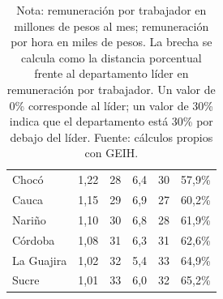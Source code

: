 \begin{table}[H]
\begin{tabular}{lrrrrr}
Chocó & 1,22 & 28 & 6,4 & 30 & 57,9\% \\
Cauca & 1,15 & 29 & 6,9 & 27 & 60,2\% \\
Nariño & 1,10 & 30 & 6,8 & 28 & 61,9\% \\
Córdoba & 1,08 & 31 & 6,3 & 31 & 62,6\% \\
La Guajira & 1,02 & 32 & 5,4 & 33 & 64,9\% \\
Sucre & 1,01 & 33 & 6,0 & 32 & 65,2\% \\
\bottomrule
\end{tabular}
\caption*{\footnotesize Nota: remuneración por trabajador en millones de pesos al mes; remuneración por hora en miles de pesos. La brecha se calcula como la distancia porcentual frente al departamento líder en remuneración por trabajador. Un valor de 0\% corresponde al líder; un valor de 30\% indica que el departamento está 30\% por debajo del líder. Fuente: cálculos propios con GEIH.}
\end{table}
